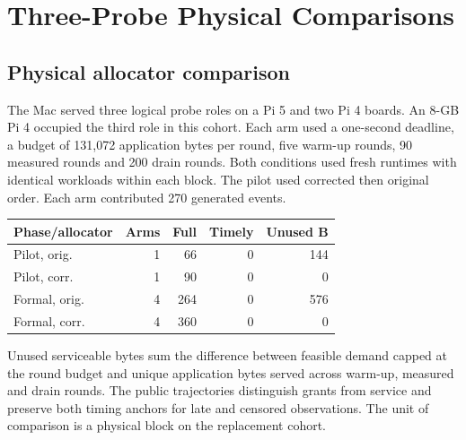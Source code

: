 \documentclass[10pt,onecolumn]{IEEEtran}
\begin{document}
\clearpage
\section{Three-Probe Physical Comparisons}
\subsection{Physical allocator comparison}
The Mac served three logical probe roles on a Pi 5 and two Pi 4 boards. An 8-GB Pi 4 occupied the third role in this cohort. Each arm used a one-second deadline, a budget of 131,072 application bytes per round, five warm-up rounds, 90 measured rounds and 200 drain rounds. Both conditions used fresh runtimes with identical workloads within each block. The pilot used corrected then original order. Each arm contributed 270 generated events.
\begin{center}\begin{tabular}{lrrrr}\toprule
Phase/allocator & Arms & Full & Timely & Unused B\\ \midrule
Pilot, orig. & 1 & 66 & 0 & 144 \\
Pilot, corr. & 1 & 90 & 0 & 0 \\
Formal, orig. & 4 & 264 & 0 & 576 \\
Formal, corr. & 4 & 360 & 0 & 0 \\
\bottomrule\end{tabular}\end{center}
Unused serviceable bytes sum the difference between feasible demand capped at the round budget and unique application bytes served across warm-up, measured and drain rounds. The public trajectories distinguish grants from service and preserve both timing anchors for late and censored observations. The unit of comparison is a physical block on the replacement cohort.
\end{document}
